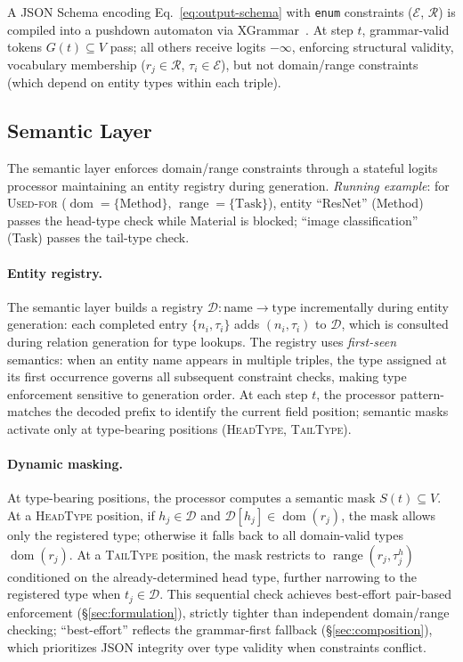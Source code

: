 A JSON Schema encoding Eq.~\eqref{eq:output-schema} with \texttt{enum} constraints ($\mathcal{E}$, $\mathcal{R}$) is compiled into a pushdown automaton via XGrammar~\cite{dong2025xgrammar}.
At step $t$, grammar-valid tokens $G(t) \subseteq V$ pass; all others receive logits $-\infty$, enforcing structural validity, vocabulary membership ($r_j \in \mathcal{R}$, $\tau_i \in \mathcal{E}$), but not domain/range constraints (which depend on entity types within each triple).

\subsection{Semantic Layer}
\label{sec:semantic}

The semantic layer enforces domain/range constraints through a stateful logits processor maintaining an entity registry during generation.
\emph{Running example}: for \textsc{Used-for} ($\operatorname{dom}{=}\{\textrm{Method}\}$, $\operatorname{range}{=}\{\textrm{Task}\}$), entity ``ResNet'' (Method) passes the head-type check while Material is blocked; ``image classification'' (Task) passes the tail-type check.

\paragraph{Entity registry.}
\label{sec:entity-registry}
The semantic layer builds a registry $\mathcal{D}: \text{name} \to \text{type}$ incrementally during entity generation: each completed entry $\{n_i, \tau_i\}$ adds $(n_i, \tau_i)$ to $\mathcal{D}$, which is consulted during relation generation for type lookups.
The registry uses \emph{first-seen} semantics: when an entity name appears in multiple triples, the type assigned at its first occurrence governs all subsequent constraint checks, making type enforcement sensitive to generation order.
At each step $t$, the processor pattern-matches the decoded prefix to identify the current field position; semantic masks activate only at type-bearing positions (\textsc{HeadType}, \textsc{TailType}).
\label{sec:position-detection}

\paragraph{Dynamic masking.}
\label{sec:dynamic-masking}
At type-bearing positions, the processor computes a semantic mask $S(t) \subseteq V$.
At a \textsc{HeadType} position, if $h_j \in \mathcal{D}$ and $\mathcal{D}[h_j] \in \operatorname{dom}(r_j)$, the mask allows only the registered type; otherwise it falls back to all domain-valid types $\operatorname{dom}(r_j)$.
At a \textsc{TailType} position, the mask restricts to $\operatorname{range}(r_j, \tau^h_j)$ conditioned on the already-determined head type, further narrowing to the registered type when $t_j \in \mathcal{D}$.
This sequential check achieves best-effort pair-based enforcement (\S\ref{sec:formulation}), strictly tighter than independent domain/range checking; ``best-effort'' reflects the grammar-first fallback (\S\ref{sec:composition}), which prioritizes JSON integrity over type validity when constraints conflict.

